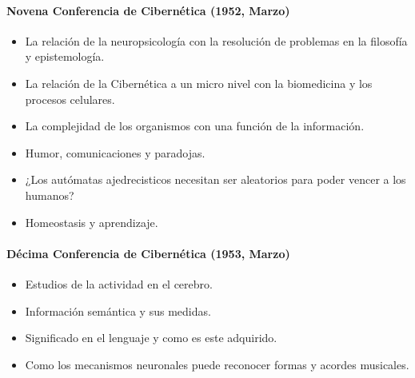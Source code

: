 	\paragraph{Novena Conferencia de Cibernética (1952, Marzo)}
	\begin{itemize}
		\item La relación de la neuropsicología con la resolución de problemas en la filosofía y epistemología.
		\item La relación de la Cibernética a un micro nivel con la biomedicina y los procesos celulares.
		\item La complejidad de los organismos con una función de la información.
		\item Humor, comunicaciones y paradojas.
		\item ¿Los autómatas ajedrecisticos necesitan ser aleatorios para poder vencer a los humanos?
		\item Homeostasis y aprendizaje.
	\end{itemize}
	\paragraph{Décima Conferencia de Cibernética (1953, Marzo)}
	\begin{itemize}
		\item Estudios de la actividad en el cerebro.
		\item Información semántica y sus medidas.
		\item Significado en el lenguaje y como es este adquirido.
		\item Como los mecanismos neuronales puede reconocer formas y acordes musicales.
	\end{itemize}



